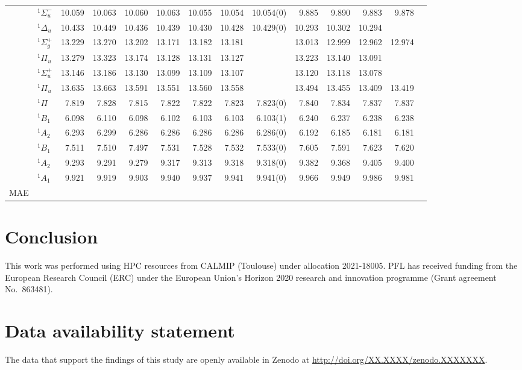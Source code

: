 \documentclass[aps,prb,reprint,noshowkeys,superscriptaddress]{revtex4-1}
\begin{document}
\begin{squeezetable}
\begin{table*}
\begin{ruledtabular}
\begin{tabular}{llrrrrrrrrrrrr}
				&	$^1\Sigma_u^-$	&10.059	&10.063	&10.060	&10.063	&10.055	&10.054	&10.054(0)	&9.885	&9.890	&9.883	&9.878	\\
				&	$^1\Delta_u$ 	&10.433	&10.449	&10.436	&10.439	&10.430	&10.428	&10.429(0)	&10.293	&10.302	&10.294	&		\\
				&	$^1\Sigma_g^+$	&13.229	&13.270	&13.202	&13.171	&13.182	&13.181	&			&13.013	&12.999	&12.962	&12.974\\
				&	$^1\Pi_u$  		&13.279	&13.323	&13.174	&13.128	&13.131	&13.127	&			&13.223	&13.140	&13.091	&		\\
				&	$^1\Sigma_u^+$	&13.146	&13.186	&13.130	&13.099	&13.109	&13.107	&			&13.120	&13.118	&13.078	&		\\
				&	$^1\Pi_u$ 		&13.635	&13.663	&13.591	&13.551	&13.560	&13.558	&			&13.494	&13.455	&13.409	&13.419\\
	\ce{HCl}	&	$^1\Pi$ 		&7.819	&7.828	&7.815	&7.822	&7.822	&7.823	&7.823(0)	&7.840	&7.834	&7.837	&7.837	\\
	\ce{H2S}	&	$^1B_1$  		&6.098	&6.110	&6.098	&6.102	&6.103	&6.103	&6.103(1)	&6.240	&6.237	&6.238	&6.238	\\
				&	$^1A_2$  		&6.293	&6.299	&6.286	&6.286	&6.286	&6.286	&6.286(0)	&6.192	&6.185	&6.181	&6.181	\\
	\ce{H2O}	&	$^1B_1$  		&7.511	&7.510	&7.497	&7.531	&7.528	&7.532	&7.533(0)	&7.605	&7.591	&7.623	&7.620	\\
				&	$^1A_2$  		&9.293	&9.291	&9.279	&9.317	&9.313	&9.318	&9.318(0)	&9.382	&9.368	&9.405	&9.400	\\
				&	$^1A_1$  		&9.921	&9.919	&9.903	&9.940	&9.937	&9.941	&9.941(0)	&9.966	&9.949	&9.986	&9.981	\\
	\hline
	MAE			&					&	\\
	\end{tabular}
	\end{ruledtabular}
\end{table*}
\end{squeezetable}

\section{Conclusion}

\begin{acknowledgements}
This work was performed using HPC resources from CALMIP (Toulouse) under allocation 2021-18005.
PFL has received funding from the European Research Council (ERC) under the European Union's Horizon 2020 research and innovation programme (Grant agreement No.~863481).
\end{acknowledgements}

\section*{Data availability statement}
The data that support the findings of this study are openly available in Zenodo at \href{http://doi.org/XX.XXXX/zenodo.XXXXXXX}{http://doi.org/XX.XXXX/zenodo.XXXXXXX}.

\end{document}
